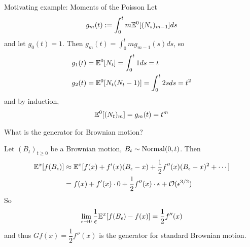 \documentclass[classnotes]{fillsntsx}
\begin{document}
\begin{exmp}{Motivating example: Moments of the Poisson}
Let 
$$\begin{aligned}
g_{m}(t) := \int_0^{t} m \mathbb{E}^{0} [(N_s)_{m-1}] ds
\end{aligned}$$ 
and let $g_0(t) = 1$. 
Then $g_{m}(t) = \int_0^{t} m g_{m-1}(s) ds$, so
$$\begin{aligned}
g_1(t) &=  \mathbb{E}^0 [N_t]=  \int_{0}^{t}  1ds = t \\
g_2(t) &= \mathbb{E}^0 [N_t(N_t - 1)]  =  \int_{0}^{t}  2sds = t^2 \\
\end{aligned}$$
and by induction,
$$\begin{aligned}
  \mathbb{E}^0 [(N_t)_m] = g_m(t) = t^m
  \end{aligned}$$
\end{exmp}

\begin{exmp}{What is the generator for Brownian motion?}

Let $(B_t)_{t \geq 0}$ be a Brownian motion, $B_t \sim \operatorname{Normal}(0, t)$. 
Then
$$\begin{aligned}
\mathbb{E}^x[f(B_\epsilon)] &\approx \mathbb{E}^x[ f(x) + f'(x) (B_\epsilon - x) + \frac{1}{2}f''(x)(B_\epsilon - x)^2 + \cdots] \\
& =  f(x) + f'(x)\cdot 0 +  \frac{1}{2}f''(x) \cdot \epsilon + \mathcal{O}(\epsilon^{3/2})
\end{aligned}$$
So
$$\begin{aligned}
\lim_{\epsilon \to 0} \dfrac{1}{\epsilon} \mathbb{E}^{x}[ f(B_\epsilon) - f(x) ] = \dfrac{1}{2} f''(x)
\end{aligned}$$
and thus $Gf(x) = \dfrac{1}{2} f''(x)$ is the generator for standard Brownian motion. 

\end{exmp}
\end{document}
